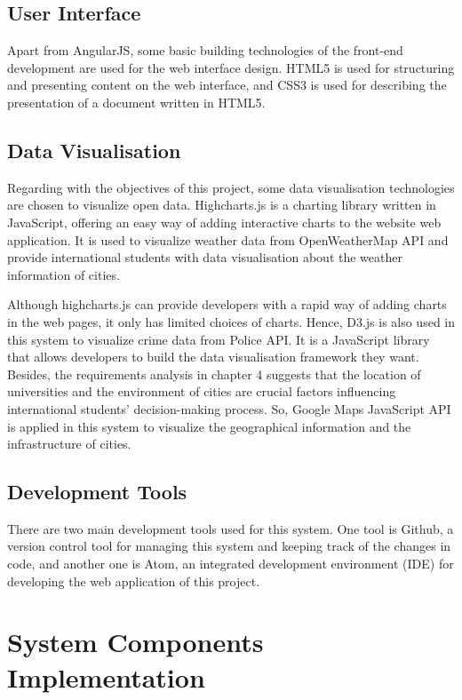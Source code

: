 \subsection{User Interface}

Apart from AngularJS, some basic building technologies of the front-end development are used for the web interface design. HTML5 is used for structuring and presenting content on the web interface, and CSS3 is used for describing the presentation of a document written in HTML5.
 
\subsection{Data Visualisation}

Regarding with the objectives of this project, some data visualisation technologies are chosen to visualize open data. Highcharts.js is a charting library written in JavaScript, offering an easy way of adding interactive charts to the website web application. It is used to visualize weather data from OpenWeatherMap API and provide international students with data visualisation about the weather information of cities. 

Although highcharts.js can provide developers with a rapid way of adding charts in the web pages, it only has limited choices of charts. Hence, D3.js is also used in this system to visualize crime data from Police API. It is a JavaScript library that allows developers to build the data visualisation framework they want. Besides, the requirements analysis in chapter 4 suggests that the location of universities and the environment of cities are crucial factors influencing international students’ decision-making process. So, Google Maps JavaScript API is applied in this system to visualize the geographical information and the infrastructure of cities.


\subsection{Development Tools}

There are two main development tools used for this system. One tool is Github, a version control tool for managing this system and keeping track of the changes in code, and another one is Atom, an integrated development environment (IDE) for developing the web application of this project.

\section{System Components Implementation}

